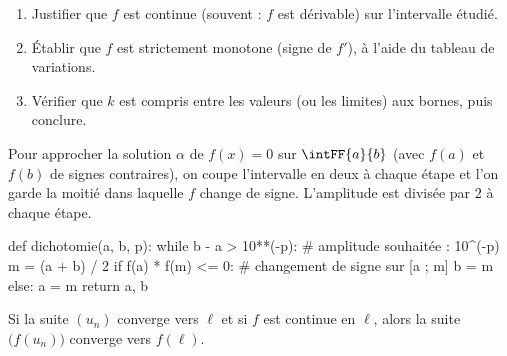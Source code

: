 \begin{savoirfaire}[Montrer qu'une équation $f(x)=k$ a une unique solution]
\begin{enumerate}[label=\otLabel{\arabic*.},leftmargin=1.6em,itemsep=0.6mm,topsep=0.5mm]
  \item Justifier que $f$ est continue (souvent : $f$ est dérivable) sur l'intervalle étudié.
  \item Établir que $f$ est strictement monotone (signe de $f'$), à l'aide du tableau de variations.
  \item Vérifier que $k$ est compris entre les valeurs (ou les limites) aux bornes, puis conclure.
\end{enumerate}
\end{savoirfaire}


\noindent
\begin{minipage}[c]{0.5\linewidth}
Pour approcher la solution $\alpha$ de $f(x)=0$ sur $\intFF{a}{b}$ (avec $f(a)$ et $f(b)$ de signes contraires), on coupe
l'intervalle en deux à chaque étape et l'on garde la moitié dans laquelle $f$ change de signe. L'amplitude est divisée
par $2$ à chaque étape.
\end{minipage}\hfill
\begin{minipage}[c]{0.45\linewidth}
\centering
{}
\end{minipage}

\begin{python}
def dichotomie(a, b, p):
    while b - a > 10**(-p):       # amplitude souhaitée : 10^(-p)
        m = (a + b) / 2
        if f(a) * f(m) <= 0:      # changement de signe sur [a ; m]
            b = m
        else:
            a = m
    return a, b
\end{python}


\begin{theoreme}
Si la suite $(u_n)$ converge vers $\ell$ et si $f$ est continue en $\ell$, alors la suite $\big(f(u_n)\big)$ converge vers $f(\ell)$.
\end{theoreme}

